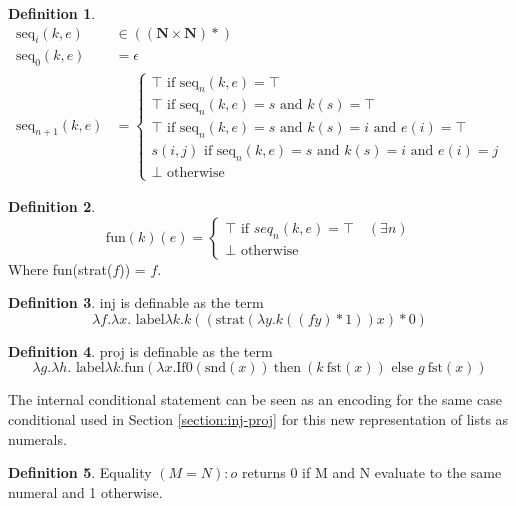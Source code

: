 \documentclass[12pt,a4paper]{report}
\theoremstyle{definition}
\newtheorem{definition}{Definition}[chapter]%
\theoremstyle{remark}
\begin{document}
\begin{definition}
\[
\begin{split}
    \text{seq}_i(k, e)& \in ((\mathbf{N} \times \mathbf{N})*)\\
    \text{seq}_0(k, e)& = \epsilon \\
    \text{seq}_{n+1}(k, e)& = 
    \begin{cases}
        \top \text{ if seq}_n(k,e) = \top\\
        \top \text{ if seq}_n(k,e) = s \text{ and }k(s) = \top\\
        \top \text{ if seq}_n(k,e) = s \text{ and }k(s) = i \text{ and } e(i) = \top\\
        s(i, j) \text{ if seq}_n(k,e) = s \text{ and }k(s) = i \text{ and } e(i) = j\\
        \bot \text{ otherwise }
    \end{cases}
\end{split}
\]
\end{definition}

\begin{definition}
    \[
    \text{fun}(k)(e)=
    \begin{cases}
        \top \text{ if } seq_n(k,e) = \top \quad (\exists n)\\
        \bot \text{ otherwise}
    \end{cases}
    \]
    Where fun(strat($f$)) = $f$.
\end{definition}

\begin{definition}
    inj is definable as the term
    \[
    \lambda f. \lambda x. \text{ label} \lambda k. k((\text{strat}(\lambda y.k((f y) * 1))x)*0)
    \]
\end{definition}

\begin{definition}
    proj is definable as the term
    \[
    \lambda g. \lambda h. \text{ label} \lambda k. \text{fun} (\lambda x.\text{If0}(\text{snd}(x))\ \text{then}\ (k\ \text{fst}(x)) \text{ else } g\ \text{fst}(x))
    \]
\end{definition}

The internal conditional statement can be seen as an encoding for the same case conditional used in Section \ref{section:inj-proj} for this new representation of lists as numerals.


\begin{definition}
    Equality $(M = N):o$ returns 0 if M and N evaluate to the same numeral and 1 otherwise. 
\end{definition}
\end{document}
